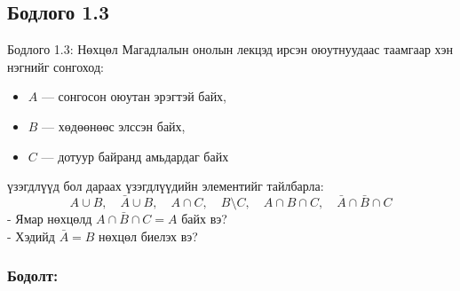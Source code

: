 \documentclass[11pt,a4paper]{article}
\begin{document}
\vspace{0.8em}

\subsection*{Бодлого 1.3}

\begin{problembox}{Бодлого 1.3: Нөхцөл}
Магадлалын онолын лекцэд ирсэн оюутнуудаас таамгаар хэн нэгнийг сонгоход:
\begin{itemize}[leftmargin=1.8em, itemsep=1pt]
  \item $A$ — сонгосон оюутан эрэгтэй байх,
  \item $B$ — хөдөөнөөс элссэн байх,
  \item $C$ — дотуур байранд амьдардаг байх
\end{itemize}
үзэгдлүүд бол дараах үзэгдлүүдийн элементийг тайлбарла:
\[
  A \cup B, \quad \bar{A} \cup B, \quad A \cap C, \quad B \setminus C, \quad A \cap B \cap C, \quad \bar{A} \cap \bar{B} \cap C
\]
- Ямар нөхцөлд $A \cap \bar{B} \cap C = A$ байх вэ?\\
- Хэдийд $\bar{A} = B$ нөхцөл биелэх вэ?
\end{problembox}

\subsubsection*{Бодолт:}
\end{document}
